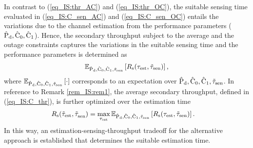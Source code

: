 \begin{coro} \label{cor_IS:cor1}
\normalfont
{} 
In contrast to (\ref{eq_IS:thr_AC}) and (\ref{eq_IS:thr_OC}), the suitable sensing time evaluated in (\ref{eq_IS:C_sen_AC}) and (\ref{eq_IS:C_sen_OC}) entails the variations due to the channel estimation from the performance parameters ($\epd, \ecz, \eco$). Hence, the secondary throughput subject to the average and the outage constraints captures the variations in the suitable sensing time and the performance parameters is determined as 
\begin{align}
\e{\epd, \ecz, \eco, \ttsen}{\rs(\test, \ttsen)} \label{eq_IS:C_thr},
\end{align}
where $\e{\epd, \ecz, \eco, \ttsen}{\cdot}$ corresponds to an expectation over $\epd, \ecz, \eco, \ttsen$.
In reference to Remark \ref{rem_IS:rem1}, the average secondary throughput, defined in (\ref{eq_IS:C_thr}), is further optimized over the estimation time 
\begin{align}
\trs(\ttest, \ttsenac) &= \maxi_{\test} \e{\epd, \ecz, \eco, \ttsen}{\rs(\test, \ttsen)} \label{eq_IS:C_thr_AC}. 
\end{align}
In this way, an estimation-sensing-throughput tradeoff for the alternative approach is established that determines the suitable estimation time.    
\end{coro}

